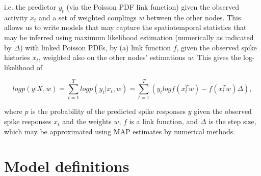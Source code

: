 \documentclass[mphil,deptreport,ianc]{infthesis} %
\begin{document}
i.e. the predictor $y_t$ (via the Poisson PDF link function) given the observed activity $x_t$ and a set of weighted couplings $w$ between the other nodes. This allows us to write models that may capture the spatiotemporal statistics that may be inferred using maximum likelihood estimation (numerically as indicated by $\Delta$) with linked Poisson PDFs, by (a) link function $f$, given the observed spike histories $x_t$, weighted also on the other nodes' estimations $w$.
This gives the log-likelihood of

\begin{equation}
    log p(y|X, w) = \sum_{t=1}^T log p(y_t| x_t, w) = \sum_{t=1}^T(y_t log f(x_t^Tw) - f(x_t^Tw)\Delta),
\end{equation}

where $p$ is the probability of the predicted spike responses $y$ given the observed spike responses $x_t$ and the weights $w$, $f$ is a link function, and $\Delta$ is the step size,
which may be approximated using MAP estimates by numerical methods.





\section{Model definitions}
\end{document}
